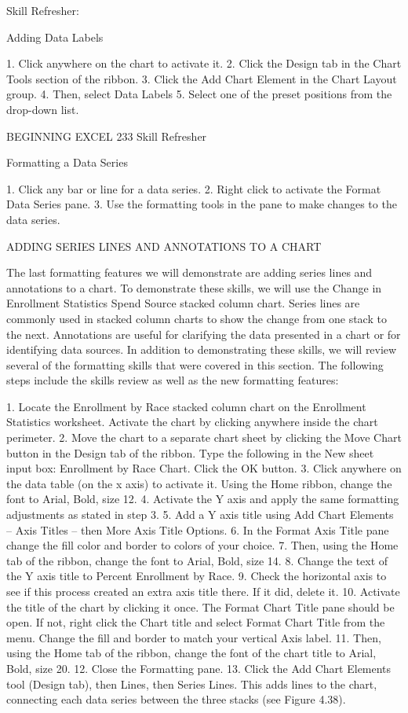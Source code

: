 Skill Refresher:


Adding Data Labels

1. Click anywhere on the chart to activate it.
2. Click the Design tab in the Chart Tools section of the ribbon.
3. Click the Add Chart Element in the Chart Layout group.
4. Then, select Data Labels
5. Select one of the preset positions from the drop-down list.




BEGINNING EXCEL 233
Skill Refresher


Formatting a Data Series

1. Click any bar or line for a data series.
2. Right click to activate the Format Data Series pane.
3. Use the formatting tools in the pane to make changes to the data series.



ADDING SERIES LINES AND ANNOTATIONS TO A CHART

The last formatting features we will demonstrate are adding series lines and annotations to a chart.
To demonstrate these skills, we will use the Change in Enrollment Statistics Spend Source stacked
column chart. Series lines are commonly used in stacked column charts to show the change from one
stack to the next. Annotations are useful for clarifying the data presented in a chart or for identifying
data sources. In addition to demonstrating these skills, we will review several of the formatting skills
that were covered in this section. The following steps include the skills review as well as the new
formatting features:

1. Locate the Enrollment by Race stacked column chart on the Enrollment Statistics worksheet.
Activate the chart by clicking anywhere inside the chart perimeter.
2. Move the chart to a separate chart sheet by clicking the Move Chart button in the Design tab of
the ribbon. Type the following in the New sheet input box: Enrollment by Race Chart. Click
the OK button.
3. Click anywhere on the data table (on the x axis) to activate it. Using the Home ribbon, change
the font to Arial, Bold, size 12.
4. Activate the Y axis and apply the same formatting adjustments as stated in step 3.
5. Add a Y axis title using Add Chart Elements – Axis Titles – then More Axis Title Options.
6. In the Format Axis Title pane change the fill color and border to colors of your choice.
7. Then, using the Home tab of the ribbon, change the font to Arial, Bold, size 14.
8. Change the text of the Y axis title to Percent Enrollment by Race.
9. Check the horizontal axis to see if this process created an extra axis title there. If it did, delete it.
10. Activate the title of the chart by clicking it once. The Format Chart Title pane should be open.
If not, right click the Chart title and select Format Chart Title from the menu. Change
the fill and border to match your vertical Axis label.
11. Then, using the Home tab of the ribbon, change the font of the chart title to Arial, Bold, size 20.
12. Close the Formatting pane.
13. Click the Add Chart Elements tool (Design tab), then Lines, then Series Lines.
This adds lines to the chart, connecting each data series between the three stacks (see Figure
4.38).




